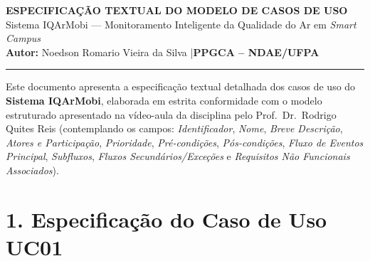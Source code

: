 \documentclass[11pt, a4paper]{article}
\begin{document}
\begin{center}
    {\Large\bfseries ESPECIFICAÇÃO TEXTUAL DO MODELO DE CASOS DE USO}\\[0.15cm]
    {\large Sistema IQArMobi --- Monitoramento Inteligente da Qualidade do Ar em \emph{Smart Campus}}\\[0.15cm]
    {\small\textbf{Autor:} Noedson Romario Vieira da Silva \quad|\quad \textbf{PPGCA -- NDAE/UFPA}}
    \vspace{0.15cm}
    \hrule
\end{center}

\vspace{0.15cm}

Este documento apresenta a especificação textual detalhada dos casos de uso do \textbf{Sistema IQArMobi}, elaborada em estrita conformidade com o modelo estruturado apresentado na vídeo-aula da disciplina pelo Prof.\ Dr.\ Rodrigo Quites Reis (contemplando os campos: \emph{Identificador}, \emph{Nome}, \emph{Breve Descrição}, \emph{Atores e Participação}, \emph{Prioridade}, \emph{Pré-condições}, \emph{Pós-condições}, \emph{Fluxo de Eventos Principal}, \emph{Subfluxos}, \emph{Fluxos Secundários/Exceções} e \emph{Requisitos Não Funcionais Associados}).

\section*{1. Especificação do Caso de Uso UC01}
\end{document}
